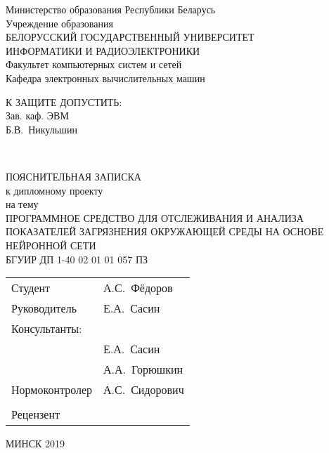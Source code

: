   \begin{center}
    Министерство образования Республики Беларусь\\[1em]
    Учреждение образования\\
    БЕЛОРУССКИЙ ГОСУДАРСТВЕННЫЙ УНИВЕРСИТЕТ \\
    ИНФОРМАТИКИ И РАДИОЭЛЕКТРОНИКИ\\[1em]

    Факультет компьютерных систем и сетей \\[0.6cm]

    Кафедра электронных вычислительных машин \\[1.4cm]

    \begin{flushright}
      \begin{minipage}{0.4\textwidth}
        \MakeUppercase{К защите допустить:}\\
        Зав. каф. ЭВМ\\
        \underline{\hspace*{2.2cm}} Б.В.~Никульшин
      \end{minipage}\\[3.2em]
    \end{flushright}

    {ПОЯСНИТЕЛЬНАЯ ЗАПИСКА}\\
    {к дипломному проекту}\\
    {на тему}\\
    {\MakeUppercase{Программное средство для отслеживания и анализа показателей загрязнения окружающей среды на основе нейронной сети}}\\[2em]


    {БГУИР ДП 1-40 02 01 01 057 ПЗ}\\[2em]

    \begin{tabular}{ p{}p{} }
      Студент & А.С.~Фёдоров  \\[1em]

      Руководитель & Е.А.~Сасин \\[1em]

      Консультанты: &\\[1em]

      \hspace*{6ex}{от кафедры ЭВМ} & Е.А.~Сасин \\[1em]

      \hspace*{6ex}{по экономической части} & А.А.~Горюшкин \\[1em]

      Нормоконтролер & А.С.~Сидорович\\
      & \\
      Рецензент &
    \end{tabular}

    \vfill
    {\normalsize МИНСК 2019}
  \end{center}

  \newpage
